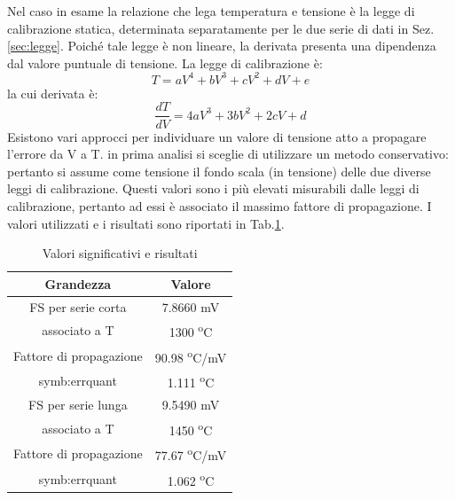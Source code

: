 Nel caso in esame la relazione che lega temperatura e tensione è la legge di calibrazione statica, determinata separatamente per le due serie di dati in Sez.\ref{sec:legge}. Poiché tale legge è non lineare, la derivata presenta una dipendenza dal valore puntuale di tensione. La legge di calibrazione è:
\begin{equation}
	T = aV^4 + bV^3+cV^2+dV+e
\end{equation}
la cui derivata è: 
\begin{equation}
	\frac{dT}{dV} = 4aV^3+3bV^2+2cV+d
\end{equation}
Esistono vari approcci per individuare un valore di tensione atto a propagare l'errore da V a T. in prima analisi si sceglie di utilizzare un metodo conservativo: pertanto si assume come tensione il fondo scala (in tensione) delle due diverse leggi di calibrazione. Questi valori sono i più elevati misurabili dalle leggi di calibrazione, pertanto ad essi è associato il massimo fattore di propagazione.
I valori utilizzati e i risultati sono riportati in Tab.\ref{tab:valorierisultati}.
\begin{table}[H]
\centering
\begin{tabular}{c|c}
	\toprule
	\toprule
	\textbf{Grandezza} & \textbf{Valore} \\
	\midrule
	FS per serie corta & 7.8660 mV\\
	associato a T & 1300 \textsuperscript{o}C\\
	\midrule
	Fattore di propagazione & 90.98 \textsuperscript{o}C/mV\\
	\midrule
	\gls{symb:errquant} & 1.111 \textsuperscript{o}C\\
	\midrule
	\midrule
	FS per serie lunga & 9.5490 mV\\
	associato a T & 1450 \textsuperscript{o}C\\
	\midrule
	Fattore di propagazione & 77.67 \textsuperscript{o}C/mV\\
	\midrule
	\gls{symb:errquant} & 1.062 \textsuperscript{o}C\\
	
	\bottomrule
	\bottomrule
\end{tabular}
\caption{Valori significativi e risultati}
\label{tab:valorierisultati}
\end{table}

